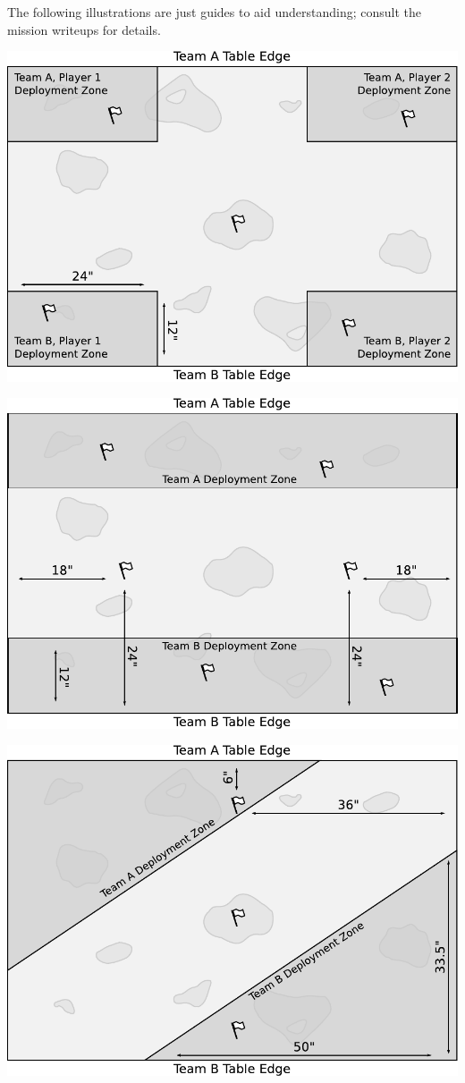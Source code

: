 \clearpage
{}

The following illustrations are just guides to aid understanding;
consult the mission writeups for details.


\bigskip\centerline{\includegraphics[scale=0.6]{maps/mission1}}


\bigskip\centerline{\includegraphics[scale=0.6]{maps/mission2}}


\bigskip\centerline{\includegraphics[scale=0.6]{maps/mission3}}
